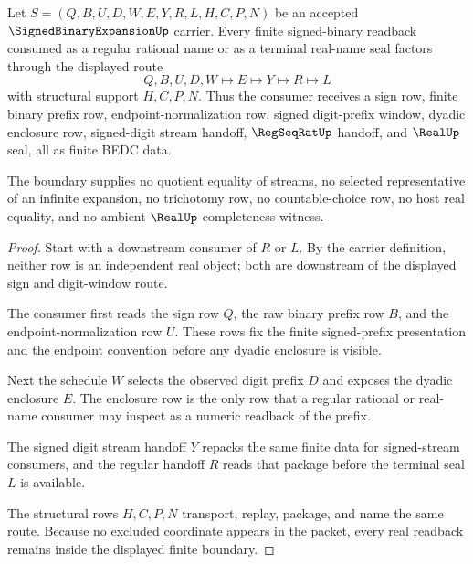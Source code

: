 \begin{theorem}
\label{thm:signed-binary-expansion-real-readback-boundary}
Let $S=(Q,B,U,D,W,E,Y,R,L,H,C,P,N)$ be an accepted $\SignedBinaryExpansionUp$ carrier. Every finite signed-binary readback consumed as a regular rational name or as a terminal real-name seal factors through the displayed route
$$
Q,B,U,D,W \longmapsto E \longmapsto Y \longmapsto R \longmapsto L
$$
with structural support $H,C,P,N$. Thus the consumer receives a sign row, finite binary prefix row, endpoint-normalization row, signed digit-prefix window, dyadic enclosure row, signed-digit stream handoff, $\RegSeqRatUp$ handoff, and $\RealUp$ seal, all as finite BEDC data.

The boundary supplies no quotient equality of streams, no selected representative of an infinite expansion, no trichotomy row, no countable-choice row, no host real equality, and no ambient $\RealUp$ completeness witness.
\end{theorem}
\begin{proof}
Start with a downstream consumer of $R$ or $L$. By the carrier definition, neither row is an independent real object; both are downstream of the displayed sign and digit-window route.

The consumer first reads the sign row $Q$, the raw binary prefix row $B$, and the endpoint-normalization row $U$. These rows fix the finite signed-prefix presentation and the endpoint convention before any dyadic enclosure is visible.

Next the schedule $W$ selects the observed digit prefix $D$ and exposes the dyadic enclosure $E$. The enclosure row is the only row that a regular rational or real-name consumer may inspect as a numeric readback of the prefix.

The signed digit stream handoff $Y$ repacks the same finite data for signed-stream consumers, and the regular handoff $R$ reads that package before the terminal seal $L$ is available.

The structural rows $H,C,P,N$ transport, replay, package, and name the same route. Because no excluded coordinate appears in the packet, every real readback remains inside the displayed finite boundary.
\end{proof}

